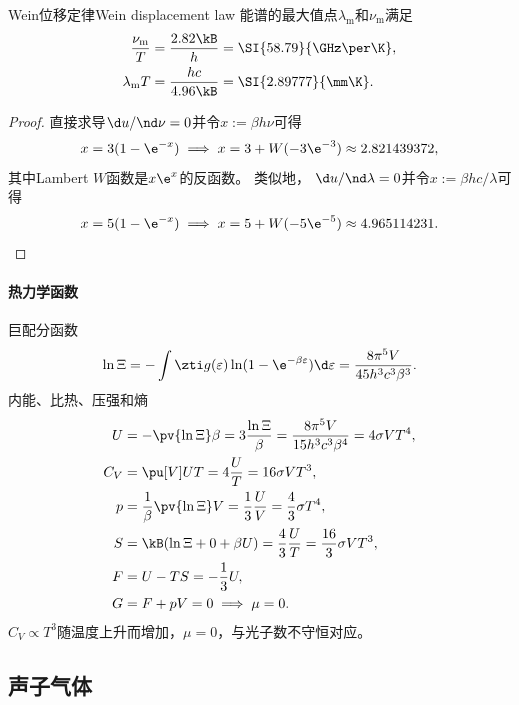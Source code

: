 \begin{theorem}
	{Wein位移定律}{Wein displacement law}
	能谱的最大值点$\lambda_{\mathrm m}$和$\nu_{\mathrm m}$满足
	\begin{subequations}
		\begin{align}
			\frac{\nu_{\mathrm m}}T&=\frac{2.82\kB}{h}=\SI{58.79}{\GHz\per\K},\\
			\lambda_{\mathrm m}T&=\frac{hc}{4.96\kB}=\SI{2.89777}{\mm\K}.		
		\end{align}
	\end{subequations}
\end{theorem}

\begin{proof}
	直接求导$\d u/\nd\nu=0$并令$x:=\beta h\nu$可得
	\[
		x=3(1-\e^{-x})\implies x=3+W(-3\e^{-3})\approx 2.821439372,
	\]
	其中Lambert $W$函数是$x\e^x$的反函数。
	类似地，
	$\d u/\nd\lambda=0$并令$x:=\beta hc/\lambda$可得
	\[
		x=5(1-\e^{-x})\implies x=5+W(-5\e^{-5})\approx 4.965114231.
		\qedhere
	\]
\end{proof}

\paragraph{热力学函数}

巨配分函数
\begin{equation}
	\ln\Xi=-\int\zti g(\varepsilon)\ln(1-\e^{-\beta\varepsilon})\d\varepsilon=\frac{8\pi^5V}{45h^3c^3\beta^3}.
\end{equation}
内能、比热、压强和熵
\begin{subequations}
	\begin{align}
		U&=-\pv{\ln\Xi}\beta=3\frac{\ln\Xi}\beta=\frac{8\pi^5V}{15h^3c^3\beta^4}=4\sigma VT^4,\\
		C_V&=\pu[V]UT=4\frac UT=16\sigma VT^3,\\
		p&=\frac1\beta\pv{\ln\Xi}V=\frac13\frac UV=\frac43\sigma T^4,\\
		S&=\kB(\ln\Xi+0+\beta U)=\frac43\frac UT=\frac{16}3\sigma VT^3,\\
		F&=U-TS=-\frac13U,\\
		G&=F+pV=0\implies\mu=0.
	\end{align}
\end{subequations}
$C_V\propto T^3$随温度上升而增加，$\mu=0$，与光子数不守恒对应。

\subsection{声子气体}

